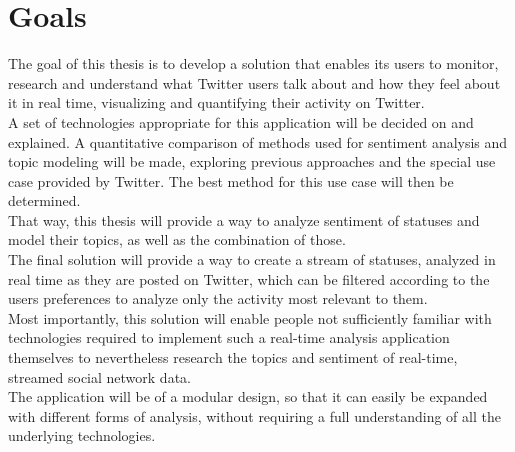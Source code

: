 \chapter{Goals}
\label{ch:goals}

The goal of this thesis is to develop a solution that enables its users to monitor,
research and understand what Twitter users talk about and how they feel about it in real time,
visualizing and quantifying their activity on Twitter.
\\
A set of technologies appropriate for this application will be decided on and explained.
A quantitative comparison of methods used for sentiment analysis and topic modeling will be made,
exploring previous approaches and the special use case provided by Twitter.
The best method for this use case will then be determined.
\\
That way, this thesis will provide a way to analyze sentiment of statuses and model their topics,
as well as the combination of those.
\\
The final solution will provide a way to create a stream of statuses, analyzed in real time as they are posted on Twitter,
which can be filtered according to the users preferences to analyze only the activity most relevant to them.
\\
Most importantly, this solution will enable people not sufficiently familiar with technologies required to
implement such a real-time analysis application themselves to nevertheless research the topics and sentiment of real-time,
streamed social network data.
\\
The application will be  of a modular design, so that it can easily be expanded with different forms of analysis,
without requiring a full understanding of all the underlying technologies.